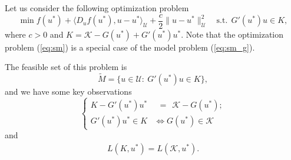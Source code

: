 \documentclass[leqno]{amsart}
\theoremstyle{definition}
\begin{document}
Let us consider the following optimization problem
\begin{equation}\label{eq:sm}
\min f(u^*) + \langle D_uf(u^*), u - u^*\rangle_{\mathcal{U}} + \frac{c}{2}\|u - u^*\|_{\mathcal{U}}^2 \quad \mbox{s.t.}\ \  G'(u^*)u \in K,
\end{equation}
where $c>0$ and $ K= \mathcal{K} - G(u^*) + G'(u^*)u^*$. Note that the optimization problem (\ref{eq:sm}) is a special case of the model problem (\ref{eq:sm_g}).

The feasible set of this problem is 
$$\tilde{M} = \{u\in \mathcal{U}:\ G'(u^*)u\in K\},$$
and we have some key observations 
\begin{equation}\label{eq:KK_e}
\left\{
\begin{aligned}
K -  G'(u^*)u^* &\ \ = \ \ \mathcal{K} - G(u^*);\\
G'(u^*)u^*\in K &\Longleftrightarrow G(u^*)\in \mathcal{K}
\end{aligned}
\right.
\end{equation}
and
\begin{equation}\label{eq:so_L}
\begin{aligned}
L(K,u^*) = L(\mathcal{K}, u^*).
\end{aligned}
\end{equation}
\end{document}

